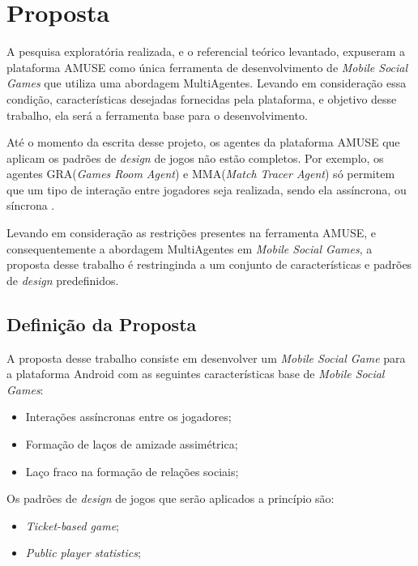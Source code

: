 \chapter[Proposta]{Proposta}

A pesquisa exploratória realizada, e o referencial teórico levantado, expuseram a
plataforma AMUSE como única ferramenta de desenvolvimento de \textit{Mobile Social Games}
que utiliza uma abordagem MultiAgentes. Levando em consideração essa condição,
características desejadas fornecidas pela plataforma, e objetivo desse trabalho, ela
será a ferramenta base para o desenvolvimento.

Até o momento da escrita desse projeto, os agentes da plataforma AMUSE que
aplicam os padrões de \textit{design} de jogos não estão completos.
Por exemplo, os agentes GRA(\textit{Games Room Agent}) e MMA(\textit{Match Tracer Agent})
só permitem que um tipo de interação entre jogadores seja realizada,
sendo ela assíncrona, ou síncrona \cite{bergenti2013}.

Levando em consideração as restrições presentes na ferramenta AMUSE, e consequentemente a
abordagem MultiAgentes em \textit{Mobile Social Games}, a proposta desse trabalho
é restringinda a um conjunto de características e padrões de \textit{design} predefinidos.

\section{Definição da Proposta}

A proposta desse trabalho consiste em desenvolver um \textit{Mobile Social Game} para a
plataforma Android com as seguintes características base de \textit{Mobile Social Games}:

\begin{itemize}
  \item Interações assíncronas entre os jogadores;
  \item Formação de laços de amizade assimétrica;
  \item Laço fraco na formação de relações sociais;
\end{itemize}

Os padrões de \textit{design} de jogos que serão aplicados a princípio são:

\begin{itemize}
  \item \textit{Ticket-based game};
  \item \textit{Public player statistics};
\end{itemize}

